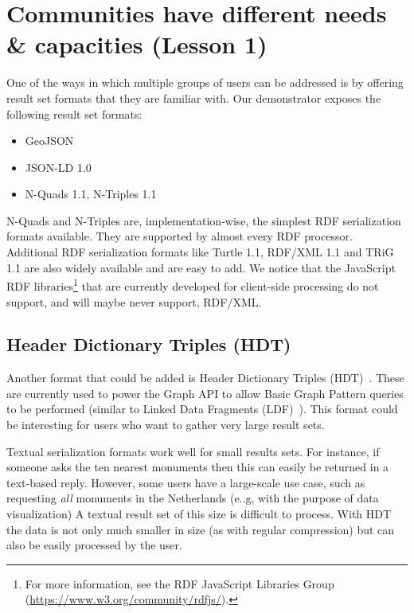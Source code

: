 \documentclass[a4paper]{scrartcl}
\begin{document}
\section{Communities have different needs \& capacities (Lesson 1)}
\label{sec:result_set_formats}

One of the ways in which multiple groups of users can be addressed is
by offering result set formats that they are familiar with.  Our
demonstrator exposes the following result set formats:

\begin{itemize}

\item GeoJSON

\item JSON-LD 1.0

\item N-Quads 1.1, N-Triples 1.1

\end{itemize}

N-Quads and N-Triples are, implementation-wise, the simplest RDF
serialization formats available.  They are supported by almost every
RDF processor.  Additional RDF serialization formats like Turtle 1.1,
RDF/XML 1.1 and TRiG 1.1 are also widely available and are easy to
add.  We notice that the JavaScript RDF libraries\footnote{For more
  information, see the RDF JavaScript Libraries Group
  (\url{https://www.w3.org/community/rdfjs/}).} that are currently
developed for client-side processing do not support, and will maybe
never support, RDF/XML.


\subsection{Header Dictionary Triples (HDT)}
\label{sec:hdt}

Another format that could be added is Header Dictionary Triples
(HDT)~\cite{Fernandez2013}.  These are currently used to power the
Graph API to allow Basic Graph Pattern queries to be performed
(similar to Linked Data Fragments (LDF)~\cite{Verborgh2014}).  This
format could be interesting for users who want to gather very large
result sets.

Textual serialization formats work well for small results sets.  For
instance, if someone asks the ten nearest monuments then this can
easily be returned in a text-based reply.  However, some users have a
large-scale use case, such as requesting \emph{all} monuments in the
Netherlands (e..g, with the purpose of data visualization) A textual
result set of this size is difficult to process.  With HDT the data is
not only much smaller in size (as with regular compression) but can
also be easily processed by the user.
\end{document}
